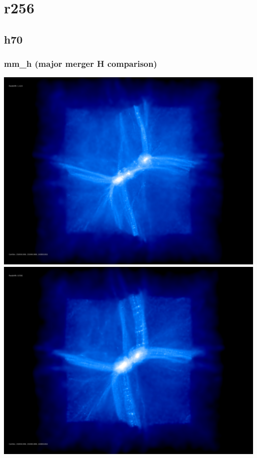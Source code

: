 \section{r256} 

\subsection{h70}

\subsubsection{mm\_h (major merger H comparison)}
\includegraphics[scale=0.1]{r256/h70/mm_h/50.jpg} 
\includegraphics[scale=0.1]{r256/h70/mm_h/100.jpg} \\
